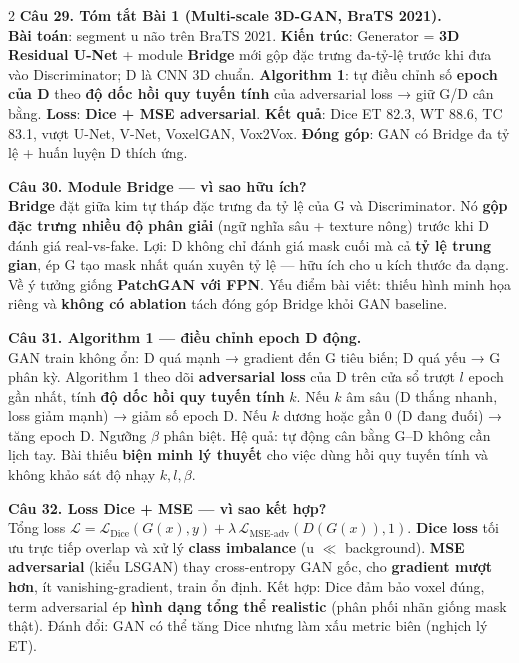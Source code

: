\begin{paracol}{2}
\textbf{Câu 29. Tóm tắt Bài 1 (Multi-scale 3D-GAN, BraTS 2021).}\\
\textbf{Bài toán}: segment u não trên BraTS 2021. \textbf{Kiến trúc}: Generator = \textbf{3D Residual U-Net} + module \textbf{Bridge} mới gộp đặc trưng đa-tỷ-lệ trước khi đưa vào Discriminator; D là CNN 3D chuẩn. \textbf{Algorithm 1}: tự điều chỉnh số \textbf{epoch của D} theo \textbf{độ dốc hồi quy tuyến tính} của adversarial loss → giữ G/D cân bằng. \textbf{Loss}: \textbf{Dice + MSE adversarial}. \textbf{Kết quả}: Dice ET 82.3, WT 88.6, TC 83.1, vượt U-Net, V-Net, VoxelGAN, Vox2Vox. \textbf{Đóng góp}: GAN có Bridge đa tỷ lệ + huấn luyện D thích ứng.

\textbf{Câu 30. Module Bridge — vì sao hữu ích?}\\
\textbf{Bridge} đặt giữa kim tự tháp đặc trưng đa tỷ lệ của G và Discriminator. Nó \textbf{gộp đặc trưng nhiều độ phân giải} (ngữ nghĩa sâu + texture nông) trước khi D đánh giá real-vs-fake. Lợi: D không chỉ đánh giá mask cuối mà cả \textbf{tỷ lệ trung gian}, ép G tạo mask nhất quán xuyên tỷ lệ — hữu ích cho u kích thước đa dạng. Về ý tưởng giống \textbf{PatchGAN với FPN}. Yếu điểm bài viết: thiếu hình minh họa riêng và \textbf{không có ablation} tách đóng góp Bridge khỏi GAN baseline.

\textbf{Câu 31. Algorithm 1 — điều chỉnh epoch D động.}\\
GAN train không ổn: D quá mạnh → gradient đến G tiêu biến; D quá yếu → G phân kỳ. Algorithm 1 theo dõi \textbf{adversarial loss} của D trên cửa sổ trượt $l$ epoch gần nhất, tính \textbf{độ dốc hồi quy tuyến tính} $k$. Nếu $k$ âm sâu (D thắng nhanh, loss giảm mạnh) → giảm số epoch D. Nếu $k$ dương hoặc gần 0 (D đang đuối) → tăng epoch D. Ngưỡng $\beta$ phân biệt. Hệ quả: tự động cân bằng G--D không cần lịch tay. Bài thiếu \textbf{biện minh lý thuyết} cho việc dùng hồi quy tuyến tính và không khảo sát độ nhạy $k,l,\beta$.

\textbf{Câu 32. Loss Dice + MSE — vì sao kết hợp?}\\
Tổng loss $\mathcal{L}=\mathcal{L}_{\text{Dice}}(G(x),y)+\lambda\,\mathcal{L}_{\text{MSE-adv}}(D(G(x)),1).$ \textbf{Dice loss} tối ưu trực tiếp overlap và xử lý \textbf{class imbalance} (u $\ll$ background). \textbf{MSE adversarial} (kiểu LSGAN) thay cross-entropy GAN gốc, cho \textbf{gradient mượt hơn}, ít vanishing-gradient, train ổn định. Kết hợp: Dice đảm bảo voxel đúng, term adversarial ép \textbf{hình dạng tổng thể realistic} (phân phối nhãn giống mask thật). Đánh đổi: GAN có thể tăng Dice nhưng làm xấu metric biên (nghịch lý ET).


\end{paracol}
